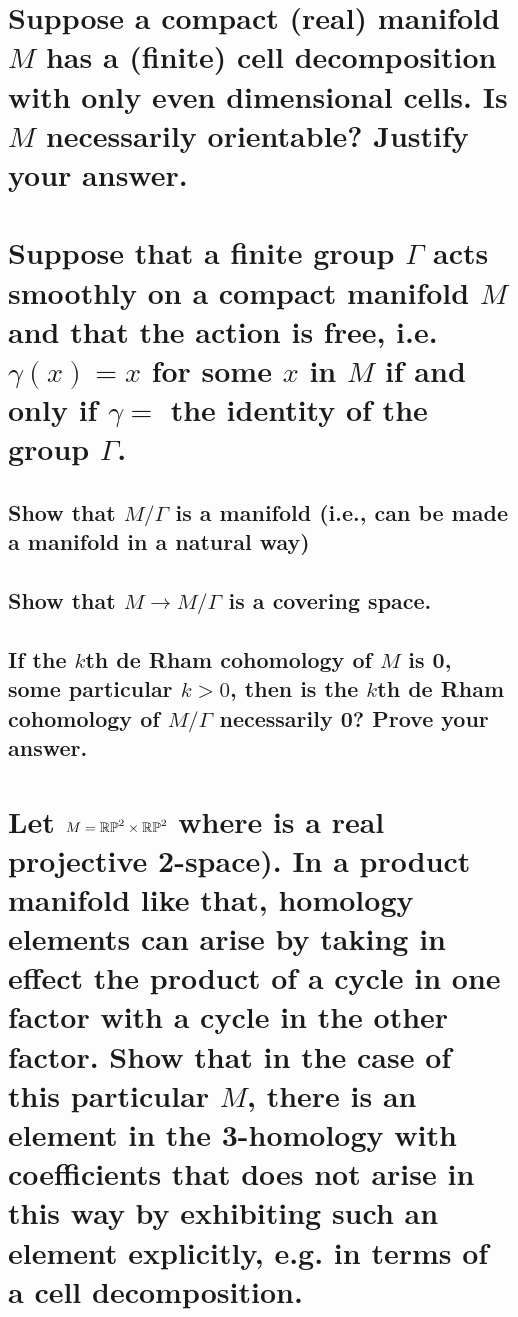 \documentclass[10pt]{article}
\begin{document}
\section{Suppose a compact (real) manifold $M$ has a (finite) cell decomposition with only even
  dimensional cells. Is $M$ necessarily orientable? Justify your answer.}

\section{Suppose that a finite group $\Gamma$ acts smoothly on a compact manifold $M$ and that the
  action is free, i.e. $\gamma(x) = x$ for some $x$ in $M$ if and only if $\gamma =$ the identity of
  the group $\Gamma$.}

\subsection{Show that $M  / \Gamma$ is a manifold (i.e., can be made a manifold in a natural way)}

\subsection{Show that $M \to M / \Gamma$ is a covering space.}

\subsection{If the $k$th de Rham cohomology of $M$ is 0, some particular $k > 0$, then is the $k$th
  de Rham cohomology of $M / \Gamma$ necessarily 0? Prove your answer.}

\section{Let $M = \mathbb{RP}^{2} \times \mathbb{RP}^{2}$ where  is a real projective
  2-space). In a product manifold like that, homology elements can arise by taking in effect the
  product of a cycle in one factor with a cycle in the other factor. Show that in the case of this
  particular $M$, there is an element in the 3-homology with \Z coefficients that does not
  arise in this way by exhibiting such an element explicitly, e.g. in terms of a cell
  decomposition.}
\end{document}
